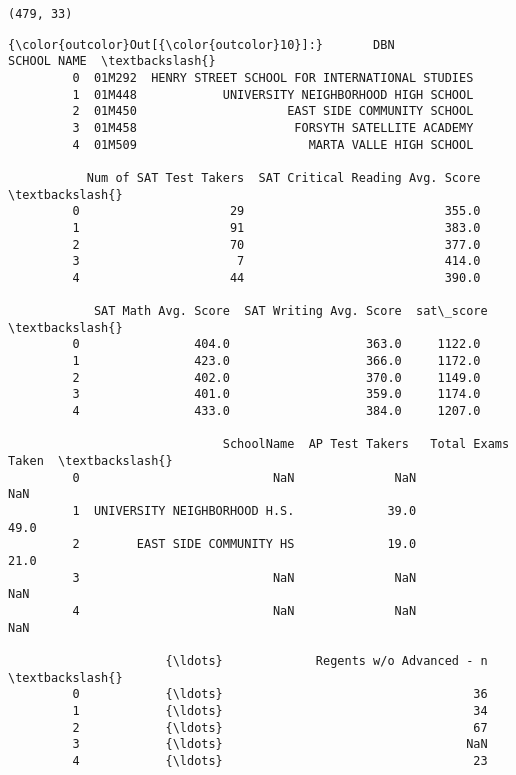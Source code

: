 \documentclass[11pt]{article}
\begin{document}
    \begin{Verbatim}[commandchars=\\\{\}]
(479, 33)

    \end{Verbatim}

\begin{Verbatim}[commandchars=\\\{\}]
{\color{outcolor}Out[{\color{outcolor}10}]:}       DBN                                    SCHOOL NAME  \textbackslash{}
         0  01M292  HENRY STREET SCHOOL FOR INTERNATIONAL STUDIES   
         1  01M448            UNIVERSITY NEIGHBORHOOD HIGH SCHOOL   
         2  01M450                     EAST SIDE COMMUNITY SCHOOL   
         3  01M458                      FORSYTH SATELLITE ACADEMY   
         4  01M509                        MARTA VALLE HIGH SCHOOL   
         
           Num of SAT Test Takers  SAT Critical Reading Avg. Score  \textbackslash{}
         0                     29                            355.0   
         1                     91                            383.0   
         2                     70                            377.0   
         3                      7                            414.0   
         4                     44                            390.0   
         
            SAT Math Avg. Score  SAT Writing Avg. Score  sat\_score  \textbackslash{}
         0                404.0                   363.0     1122.0   
         1                423.0                   366.0     1172.0   
         2                402.0                   370.0     1149.0   
         3                401.0                   359.0     1174.0   
         4                433.0                   384.0     1207.0   
         
                              SchoolName  AP Test Takers   Total Exams Taken  \textbackslash{}
         0                           NaN              NaN                NaN   
         1  UNIVERSITY NEIGHBORHOOD H.S.             39.0               49.0   
         2        EAST SIDE COMMUNITY HS             19.0               21.0   
         3                           NaN              NaN                NaN   
         4                           NaN              NaN                NaN   
         
                      {\ldots}             Regents w/o Advanced - n  \textbackslash{}
         0            {\ldots}                                   36   
         1            {\ldots}                                   34   
         2            {\ldots}                                   67   
         3            {\ldots}                                  NaN   
         4            {\ldots}                                   23   
         

\end{Verbatim}
\end{document}
